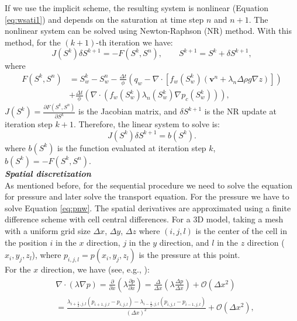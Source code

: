 \documentclass[12pt]{article}
\begin{document}
 If we use the implicit scheme, the resulting system is nonlinear (Equation \eqref{eq:wsati1}) and depends on the saturation at time step $n$ and $n+1$. The nonlinear system can be solved using Newton-Raphson (NR) method. With this method, for the $(k+1)$-th iteration we have:
$${J}({S}^k)\delta{S}^{k+1}=-{F}({S}^k,{S}^n),
\qquad {S}^{k+1}={S}^k+\delta {S}^{k+1},$$
where
\begin{align}\label{eq:wsati2}
 {F}({S}^k,{S}^n)&={S}_{w}^{k}-{S}_{w}^n-\frac{\Delta t}{\phi}\left(q_w-\nabla \cdot [f_w({S}_{w}^{k})( \mathbf{v}^n+\lambda_n\Delta  \rho g\nabla z)]\right)\nonumber \\ 
 &+\frac{\Delta t}{\phi}\left(\nabla\cdot(f_w({S}_{w}^{k})\lambda_n({S}_{w}^{k})\nabla p_c({S}_{w}^{k}))\right),
\end{align}
${J}({S}^k)=\frac{\partial {F}({S}^k,{S}^n)}{\partial {S}^k}$ is the 
Jacobian matrix, and $\delta {S}^{k+1}$ is the NR update at iteration step $k+1$. Therefore, the linear system to solve is:\\
\begin{equation}\label{eq:lsS}
{J}({S}^k)\delta {S}^{k+1}={b}({S}^k).
\end{equation}
where ${b}({S}^k)$ is the function evaluated at iteration step $k$, ${b}({S}^k)=-{F}({S}^k,{S}^n)$.\\
\emph{\textbf{Spatial discretization}}\\
As mentioned before, for the sequential procedure we need to solve the equation for pressure and later solve the transport equation. 
For the pressure we have to solve Equation \eqref{eq:pnw}. 
The spatial derivatives are approximated using a finite difference scheme with cell central differences. For a 3D model, taking a mesh with a uniform grid size $\Delta x$, $\Delta y$, $\Delta z$ where $(i,j,l)$ is the center 
of the cell
in the position $i$ in the $x$ direction, $j$ in the $y$ direction, and $l$ in the $z$ direction
($x_i,y_j,z_l$), where $p_{i,j,l}=p(x_i,y_j,z_l)$ is 
the pressure at this point.
\\ For the $x$ direction, we have (see, e.g., \cite{Aziz79,Chen06,Jansen13}):
\begin{align*}
&\nabla \cdot (\lambda \nabla p)=\frac{\partial}{\partial x}\left(\lambda \frac{\partial p}{\partial x}\right) = 
\frac{\Delta}{\Delta x}\left(\lambda \frac{\Delta p}{\Delta x}\right) +\mathscr{O}(\Delta x^2)\\
&=\frac{ \lambda _{i+\frac{1}{2},j,l}(p_{i+1,j,l}-p_{i,j,l})-\lambda _{i-\frac{1}{2},j,l}(p_{i,j,l}-p_{i-1,j,l})}{\left( \Delta x\right)^2}+\mathscr{O}(\Delta x^2),
\end{align*}
\end{document}
